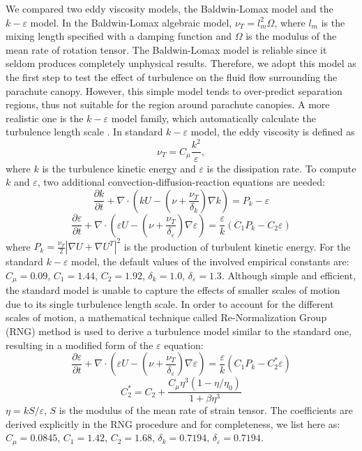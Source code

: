 We compared two eddy viscosity models, the Baldwin-Lomax model and the
$k-\varepsilon$ model.  In the Baldwin-Lomax \cite{Bldwin78} algebraic model,
$\nu_T = l_m^2\Omega$, where $l_m$ is the mixing length specified with a damping
function and $\Omega$ is the modulus of the mean rate of rotation tensor.  The
Baldwin-Lomax model is reliable since it seldom produces completely unphysical
results. Therefore, we adopt this model as the first step to test the effect of
turbulence on the fluid flow surrounding the parachute canopy. However, this
simple model tends to over-predict separation regions, thus not suitable for the
region around parachute canopies. A more realistic one is the 
$k-\varepsilon$ model family, which automatically
calculate the turbulence length scale \cite{wilcox1998turbulence}.  In standard
$k-\varepsilon$ model, the eddy viscosity is defined as \begin{equation} \nu_T =
C_{\mu}\frac{k^2}{\varepsilon}, \label{eq:nuT} \end{equation} where $k$ is the
turbulence kinetic energy and $\varepsilon$ is the dissipation rate. To compute
$k$ and $\varepsilon$, two additional convection-diffusion-reaction equations
are needed: \begin{equation} \frac{\partial k}{\partial
t}+\nabla\cdot(kU-(\nu+\frac{\nu_T}{\delta_k})\nabla k) =P_k - \varepsilon
\label{eq:k} \end{equation} \begin{equation} \frac{\partial
\varepsilon}{\partial t}+\nabla\cdot(\varepsilon U
-(\nu+\frac{\nu_T}{\delta_\varepsilon})\nabla \varepsilon)
=\frac{\varepsilon}{k}(C_1P_k-C_2\varepsilon) \label{eq:eps} \end{equation}
where $P_k = \frac{\nu_T}{2}|\nabla U + \nabla U^T|^2$ is the production of
turbulent kinetic energy. For the standard $k-\varepsilon$ model, the default
values of the involved empirical constants are: $C_\mu = 0.09$, $C_1 = 1.44$,
$C_2=1.92$, $\delta_k=1.0$, $\delta_{\varepsilon}=1.3$.  Although simple and
efficient, the standard model is unable to capture the effects of smaller scales
of motion due to its single turbulence length scale.  In order to account for
the different scales of motion, a mathematical technique called Re-Normalization
Group (RNG) method \cite{yakhot1992renormalization} is used to derive a
turbulence model similar to the standard one, resulting in a modified form of
the $\varepsilon$ equation: \begin{equation} \frac{\partial
\varepsilon}{\partial t}+\nabla\cdot(\varepsilon U
-(\nu+\frac{\nu_T}{\delta_\varepsilon})\nabla \varepsilon)
=\frac{\varepsilon}{k}(C_1P_k-C^*_2\varepsilon) \label{eq:RNG} \end{equation}
\begin{equation} C^*_2=C_2+\frac{C_{\mu}\eta^3(1-\eta/\eta_0)}{1+\beta\eta^3}
\end{equation} $\eta = kS/\varepsilon$, $S$ is the modulus of the mean rate of
strain tensor.  The coefficients are derived explicitly in the RNG procedure and
for completeness, we list here as: $C_\mu = 0.0845$, $C_1 = 1.42$, $C_2=1.68$,
$\delta_k=0.7194$, $\delta_{\varepsilon}=0.7194$.


